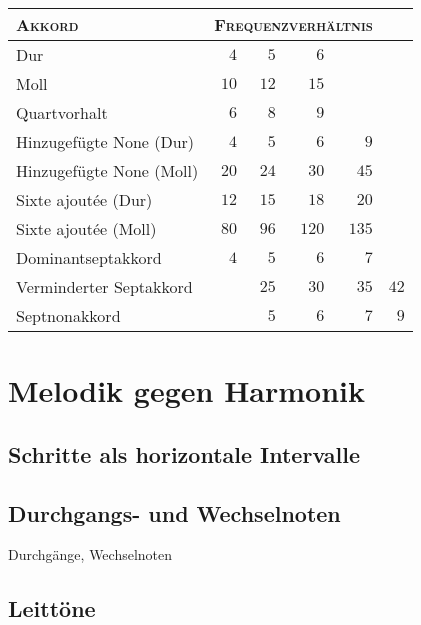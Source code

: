 \documentclass[ngerman,11pt]{scrartcl}
\begin{document}
\begin{table}
  \centering
  \begin{tabular}{lrrrrr}
    \toprule
    \textsc{Akkord} & \multicolumn{4}{l}{\textsc{Frequenzverhältnis}}\\
    \midrule
    Dur                         & $4$  & $5$  & $6$\\
    Moll                        & $10$ & $12$ & $15$\\
    Quartvorhalt                & $6$  & $8$  & $9$\\
    Hinzugefügte None (Dur)     & $4$  & $5$  & $6$  & $9$\\
    Hinzugefügte None (Moll)    & $20$ & $24$ & $30$ & $45$\\
    Sixte ajoutée (Dur)         & $12$ & $15$ & $18$ & $20$\\
    Sixte ajoutée (Moll)        & $80$ & $96$ & $120$ & $135$\\
    Dominantseptakkord          & $4$  & $5$  & $6$  & $7$\\
    Verminderter Septakkord     &      & $25$ & $30$ & $35$ & $42$\\
    Septnonakkord               &      & $5$  & $6$  & $7$  & $9$\\
    \bottomrule
  \end{tabular}
\end{table}

\section{Melodik gegen Harmonik}

\subsection{Schritte als horizontale Intervalle}

\subsection{Durchgangs- und Wechselnoten}

Durchgänge, Wechselnoten

\subsection{Leittöne}
\label{sec:ln}
\end{document}
